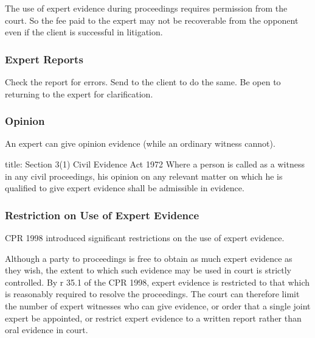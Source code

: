 \documentclass[
]{article}
\newenvironment{Shaded}{}{}
\newcommand{\NormalTok}[1]{#1}
\begin{document}
The use of expert evidence during proceedings requires permission from
the court. So the fee paid to the expert may not be recoverable from the
opponent even if the client is successful in litigation.

\hypertarget{expert-reports}{%
\subsubsection{Expert Reports}\label{expert-reports}}

Check the report for errors. Send to the client to do the same. Be open
to returning to the expert for clarification.

\hypertarget{opinion}{%
\subsubsection{Opinion}\label{opinion}}

An expert can give opinion evidence (while an ordinary witness cannot).

\begin{Shaded}
\begin{Highlighting}[]
\NormalTok{title: Section 3(1) Civil Evidence Act 1972}
\NormalTok{Where a person is called as a witness in any civil proceedings, his opinion on any relevant matter on which he is qualified to give expert evidence shall be admissible in evidence.}
\end{Highlighting}
\end{Shaded}

\hypertarget{restriction-on-use-of-expert-evidence}{%
\subsubsection{Restriction on Use of Expert
Evidence}\label{restriction-on-use-of-expert-evidence}}

CPR 1998 introduced significant restrictions on the use of expert
evidence.

Although a party to proceedings is free to obtain as much expert
evidence as they wish, the extent to which such evidence may be used in
court is strictly controlled. By r 35.1 of the CPR 1998, expert evidence
is restricted to that which is reasonably required to resolve the
proceedings. The court can therefore limit the number of expert
witnesses who can give evidence, or order that a single joint expert be
appointed, or restrict expert evidence to a written report rather than
oral evidence in court.
\end{document}
